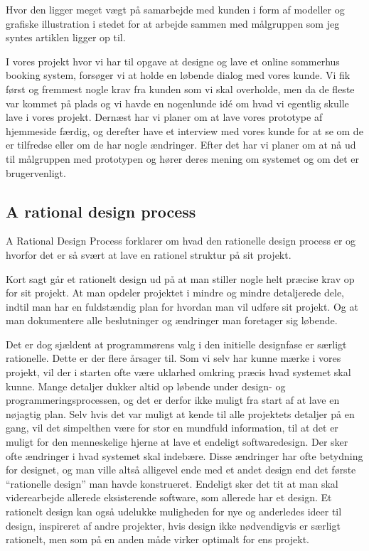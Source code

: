 \documentclass[12pt,a4paper]{article}
\begin{document}
Hvor den ligger meget vægt på samarbejde med kunden i form af modeller og grafiske illustration i stedet for at arbejde sammen med målgruppen som jeg syntes artiklen ligger op til.

I vores projekt hvor vi har til opgave at designe og lave et online sommerhus booking system, forsøger vi at holde en løbende dialog med vores kunde. Vi fik først og fremmest nogle krav fra kunden som vi skal overholde, men da de fleste var kommet på plads og vi havde en nogenlunde idé om hvad vi egentlig skulle lave i vores projekt. Dernæst har vi planer om at lave vores prototype af hjemmeside færdig, og derefter have et interview med vores kunde for at se om de er tilfredse eller om de har nogle ændringer. Efter det har vi planer om at nå ud til målgruppen med prototypen og hører deres mening om systemet og om det er brugervenligt.
\subsection{A rational design process}
A Rational Design Process forklarer om hvad den rationelle design process er og hvorfor det er så svært at lave en rationel struktur på sit projekt.

Kort sagt går et rationelt design ud på at man stiller nogle helt præcise krav op for sit projekt. At man opdeler projektet i mindre og mindre detaljerede dele, indtil man har en fuldstændig plan for hvordan man vil udføre sit projekt. Og at man dokumentere alle beslutninger og ændringer man foretager sig løbende.

Det er dog sjældent at programmørens valg i den initielle designfase er særligt rationelle. Dette er der flere årsager til. Som vi selv har kunne mærke i vores projekt, vil der i starten ofte være uklarhed omkring præcis hvad systemet skal kunne. Mange detaljer dukker altid op løbende under design- og programmeringsprocessen, og det er derfor ikke muligt fra start af at lave en nøjagtig plan. Selv hvis det var muligt at kende til alle projektets detaljer på en gang, vil det simpelthen være for stor en mundfuld information, til at det er muligt for den menneskelige hjerne at lave et endeligt softwaredesign. Der sker ofte ændringer i hvad systemet skal indebære. Disse ændringer har ofte betydning for designet, og man ville altså alligevel ende med et andet design end det første “rationelle design” man havde konstrueret. Endeligt sker det tit at man skal viderearbejde allerede eksisterende software, som allerede har et design. Et rationelt design kan også udelukke muligheden for nye og anderledes ideer til design, inspireret af andre projekter, hvis design ikke nødvendigvis er særligt rationelt, men som på en anden måde virker optimalt for ens projekt.
\end{document}
